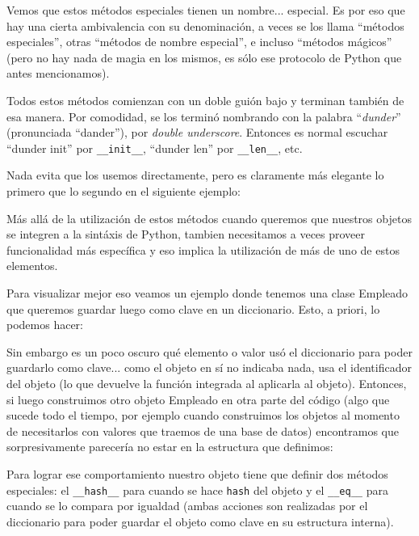 Vemos que estos métodos especiales tienen un nombre... especial. Es por eso que hay una cierta ambivalencia con su denominación, a veces se los llama ``métodos especiales'', otras ``métodos de nombre especial'', e incluso ``métodos mágicos'' (pero no hay nada de magia en los mismos, es sólo ese protocolo de Python que antes mencionamos).

\begin{info}
Todos estos métodos comienzan con un doble guión bajo y terminan también de esa manera. Por comodidad, se los terminó nombrando con la palabra ``\textit{dunder}'' (pronunciada ``dander''), por \textit{double underscore}. Entonces es normal escuchar ``dunder init'' por \texttt{\_\_init\_\_}, ``dunder len'' por \texttt{\_\_len\_\_}, etc.
\end{info}

Nada evita que los usemos directamente, pero es claramente más elegante lo primero que lo segundo en el siguiente ejemplo:


Más allá de la utilización de estos métodos cuando queremos que nuestros objetos se integren a la sintáxis de Python, tambien necesitamos a veces proveer funcionalidad más específica y eso implica la utilización de más de uno de estos elementos.

Para visualizar mejor eso veamos un ejemplo donde tenemos una clase Empleado que queremos guardar luego como clave en un diccionario. Esto, a priori, lo podemos hacer:


Sin embargo es un poco oscuro qué elemento o valor usó el diccionario para poder guardarlo como clave... como el objeto en sí no indicaba nada, usa el identificador del objeto (lo que devuelve la función integrada  al aplicarla al objeto). Entonces, si luego construimos otro objeto Empleado en otra parte del código (algo que sucede todo el tiempo, por ejemplo cuando construimos los objetos al momento de necesitarlos con valores que traemos de una base de datos) encontramos que sorpresivamente parecería no estar en la estructura que definimos:


Para lograr ese comportamiento nuestro objeto tiene que definir dos métodos especiales: el \texttt{\_\_hash\_\_} para cuando se hace \texttt{hash} del objeto y el \texttt{\_\_eq\_\_} para cuando se lo compara por igualdad (ambas acciones son realizadas por el diccionario para poder guardar el objeto como clave en su estructura interna).

